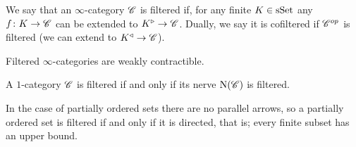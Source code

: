 \documentclass[../../thesis.tex]{subfiles}
\begin{document}
\begin{definition}
    We say that an $\infty$-category $\mathscr{C}$ is filtered if, for any finite $K\in \mathrm{sSet}$ any $f\colon K\to \mathscr{C}$ can be extended to $K^{\triangleright} \to \mathscr{C}$.
    Dually, we say it is cofiltered if $\mathscr{C}^{op}$ is filtered (we can extend to $K^{\triangleleft} \to \mathscr{C}$).
\end{definition}
\begin{proposition}\label{5.3.1.20}
    Filtered $\infty$-categories are weakly contractible.
\end{proposition}
\begin{proposition}\label{NerveFilter}
    A $1$-category $\mathscr{C}$ is filtered if and only if its nerve $\mathrm{N}(\mathscr{C})$ is filtered.
\end{proposition}
\begin{remark}\label{filteredposet}
    In the case of partially ordered sets there are no parallel arrows, so a partially ordered set is filtered if and only if it is directed, that is; every finite subset has an upper bound.
\end{remark}
\end{document}
